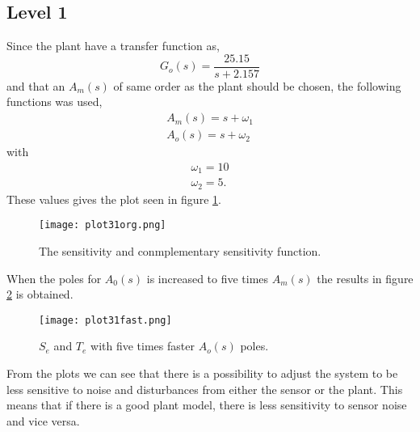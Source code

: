 \subsection*{Level 1}
Since the plant have a transfer function as,
\begin{equation}
  G_o(s)=\frac{25.15}{s+2.157}
\end{equation}
and that an $A_m(s)$ of same order as the plant should be chosen, the
following functions was used,
\begin{align*}
    A_m(s)=s+\omega_1 \\
    A_o(s)=s+\omega_2
\end{align*}
with
\begin{align*}
    \omega_1 = 10 \\
    \omega_2 = 5.
\end{align*}
These values gives the plot seen in figure \ref{fig:sens31org}.
\begin{figure}[H]
  \centering
  \texttt{[image: plot31org.png]}
  \caption{The sensitivity and conmplementary sensitivity function.}
  \label{fig:sens31org}
\end{figure}
When the poles for $A_0(s)$ is increased to five times $A_m(s)$ the
results in figure \ref{fig:sens31fast} is obtained. 
\begin{figure}[H]
    \centering
    \texttt{[image: plot31fast.png]}
    \caption{$S_e$ and $T_e$ with five times faster $A_o(s)$ poles.}
    \label{fig:sens31fast}
\end{figure}
From the plots we can see that there is a possibility to adjust the
system to be less sensitive to noise and disturbances from either the
sensor or the plant. This means that if there is a good plant model,
there is less sensitivity to sensor noise and vice versa.
